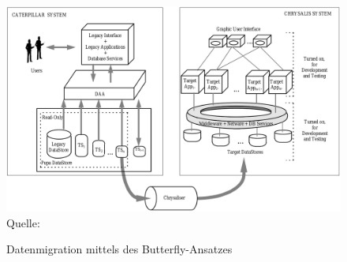 \begin{figure}
	\centering
	\caption{Datenmigration mittels des Butterfly-Ansatzes}
	\label{pic:datemigration_Butterfly}
	\includegraphics[width=1.0\textwidth]{../images/vorgehensweisen_fig_01.png} \\
	\tiny Quelle: \citep[Abbildung~11]{wuLawless-1997}
\end{figure}

\newpage

